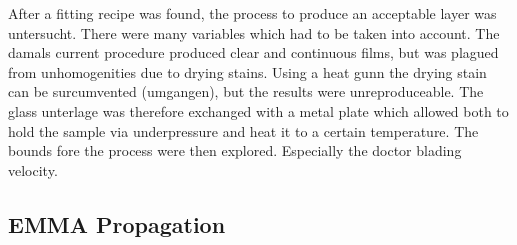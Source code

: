 \documentclass[a4paper]{article}
\begin{document}
After a fitting recipe was found, the process to produce an acceptable layer was untersucht. 
There were many variables which had to be taken into account. 
The damals current procedure produced clear and continuous films, but was plagued from unhomogenities due to drying stains. 
Using a heat gunn the drying stain can be surcumvented (umgangen), but the results were unreproduceable. 
The glass unterlage was therefore exchanged with a metal plate which allowed both to hold the sample via underpressure and heat it to a certain temperature.
The bounds fore the process were then explored. 
Especially the doctor blading velocity.




\iffalse
\subsection{EMMA Propagation}
\end{document}
